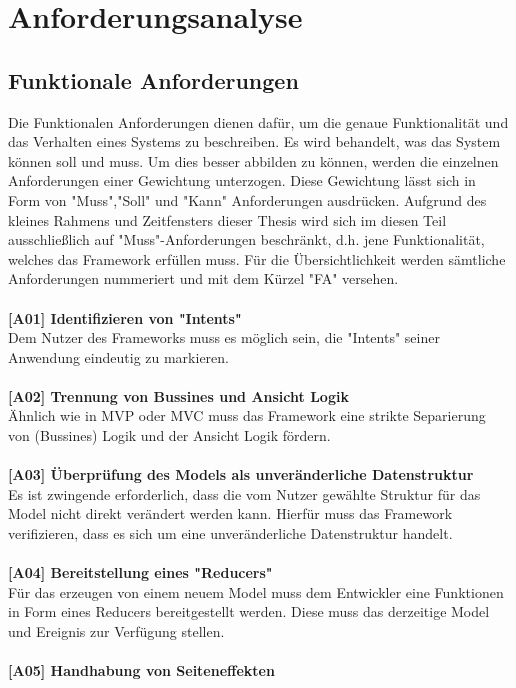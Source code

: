 \section{Anforderungsanalyse}
\label{sec:anforderungsanalyse}

\subsection{Funktionale Anforderungen}
Die Funktionalen Anforderungen dienen dafür, um die genaue Funktionalität und das Verhalten eines Systems zu beschreiben. Es wird behandelt, was das System können soll und muss. Um dies besser abbilden zu können, werden die einzelnen Anforderungen einer Gewichtung unterzogen. Diese Gewichtung lässt sich in Form von "Muss","Soll" und "Kann" Anforderungen ausdrücken. Aufgrund des kleines Rahmens und Zeitfensters dieser Thesis wird sich im diesen Teil ausschließlich auf "Muss"-Anforderungen beschränkt, d.h. jene Funktionalität, welches das Framework erfüllen muss. Für die Übersichtlichkeit werden sämtliche Anforderungen nummeriert und mit dem Kürzel "FA" versehen.
\\
\\
\textbf{[A01] Identifizieren von "Intents"}
\\
Dem Nutzer des Frameworks muss es möglich sein, die "Intents" seiner Anwendung eindeutig zu markieren.
\\
\\
\textbf{[A02] Trennung von Bussines und Ansicht Logik}
\\
Ähnlich wie in MVP oder MVC muss das Framework eine strikte Separierung von (Bussines) Logik und der Ansicht Logik fördern. 
\\
\\
\textbf{[A03] Überprüfung des Models als unveränderliche Datenstruktur}
\\
Es ist zwingende erforderlich, dass die vom Nutzer gewählte Struktur für das Model nicht direkt verändert werden kann. Hierfür muss das Framework verifizieren, dass es sich um  eine  unveränderliche Datenstruktur
handelt.
\\
\\
\textbf{[A04] Bereitstellung eines "Reducers"}
\\
Für das erzeugen von einem neuem Model muss dem Entwickler eine Funktionen in Form eines Reducers bereitgestellt werden. Diese muss das derzeitige Model und Ereignis zur Verfügung stellen. 
\\
\\
\textbf{[A05] Handhabung von Seiteneffekten}

